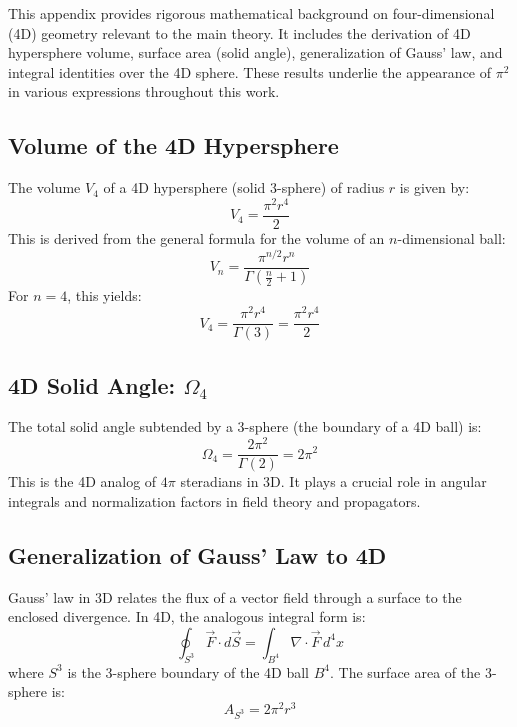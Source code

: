 \documentclass[12pt,a4paper]{article}
\begin{document}
This appendix provides rigorous mathematical background on four-dimensional (4D) geometry relevant to the main theory. It includes the derivation of 4D hypersphere volume, surface area (solid angle), generalization of Gauss' law, and integral identities over the 4D sphere. These results underlie the appearance of \(\pi^2\) in various expressions throughout this work.

\subsection{Volume of the 4D Hypersphere}

The volume \(V_4\) of a 4D hypersphere (solid 3-sphere) of radius \(r\) is given by:
\begin{equation}
V_4 = \frac{\pi^2 r^4}{2}
\end{equation}
This is derived from the general formula for the volume of an \(n\)-dimensional ball:
\begin{equation}
V_n = \frac{\pi^{n/2} r^n}{\Gamma\left( \frac{n}{2} + 1 \right)}
\end{equation}
For \(n = 4\), this yields:
\begin{equation}
V_4 = \frac{\pi^2 r^4}{\Gamma(3)} = \frac{\pi^2 r^4}{2}
\end{equation}

\subsection{4D Solid Angle: \(\Omega_4\)}

The total solid angle subtended by a 3-sphere (the boundary of a 4D ball) is:
\begin{equation}
\Omega_4 = \frac{2 \pi^{2}}{\Gamma(2)} = 2\pi^2
\end{equation}
This is the 4D analog of \(4\pi\) steradians in 3D. It plays a crucial role in angular integrals and normalization factors in field theory and propagators.

\subsection{Generalization of Gauss' Law to 4D}

Gauss' law in 3D relates the flux of a vector field through a surface to the enclosed divergence. In 4D, the analogous integral form is:
\begin{equation}
\oint_{S^3} \vec{F} \cdot d\vec{S} = \int_{B^4} \nabla \cdot \vec{F} \, d^4x
\end{equation}
where \(S^3\) is the 3-sphere boundary of the 4D ball \(B^4\). The surface area of the 3-sphere is:
\begin{equation}
A_{S^3} = 2\pi^2 r^3
\end{equation}
\end{document}
